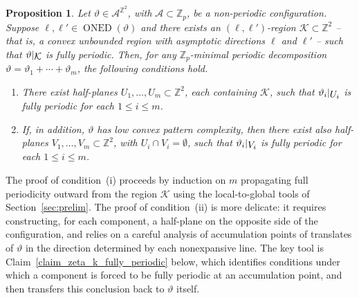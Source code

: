 \documentclass[12pt]{amsart}
\numberwithin{equation}{section}
\newtheorem{proposition}[theorem]{Proposition}
\DeclareMathOperator{\nexpd}{ONED}
\newcommand{\bb}[1]{\mathbb{#1}}
\newcommand{\sob}[1]{\ensuremath{{\mathbin |}\raise-.4ex\hbox{$#1$}}}
\begin{document}
\begin{proposition}\label{prop_fully_periodic_on strips}
Let $\vartheta \in \mathcal{A}^{\bb{Z}^2}$, with \(\mathcal{A} \subset \bb{Z}_p\), be a non-periodic configuration. Suppose $\pmb{\ell}, \pmb{\ell}' \in \nexpd(\vartheta)$ and there exists an $(\pmb{\ell},\pmb{\ell}')$-region $\mathcal{K} \subset \mathbb{Z}^2$ -- that is, a convex unbounded region with asymptotic directions $\pmb{\ell}$ and $\pmb{\ell}'$ -- such that $\vartheta \sob{\mathcal{K}}$ is fully periodic. Then, for any $\bb{Z}_p$-minimal periodic decomposition $\vartheta = \vartheta_1+\cdots+\vartheta_m$, the following conditions hold.   
\begin{enumerate}[label=(\roman*), itemsep=5pt]
	\item There exist half-planes $U_1, \ldots, U_m \subset \bb{Z}^2$, each containing $\mathcal{K} $, such that $\vartheta_i\sob{U_i}$ is fully periodic for each $ 1\le i \le m $. 
	
	\item If, in addition, $\vartheta$ has low convex pattern complexity, then there exist also half-planes $V_1, \ldots, V_m \subset \bb{Z}^2$, with $U_i \cap V_i = \emptyset$, such that $\vartheta_i\sob{V_i}$ is fully periodic for each $ 1\le i \le m $.
\end{enumerate}
\end{proposition}

The proof of condition~(i) proceeds by induction on $m$ propagating full periodicity outward from the region $ \mathcal K $ using the local-to-global tools of Section~\ref{sec:prelim}. The proof of condition~(ii) is more delicate: it requires constructing, for each component, a half-plane on the opposite side of the configuration, and relies on a careful analysis of accumulation points of translates of $\vartheta$ in the direction determined by each nonexpansive line. The key tool is Claim~\ref{claim_zeta_k_fully_periodic} below, which identifies conditions under which a component is forced to be fully periodic at an accumulation point, and then transfers this conclusion back to $\vartheta$ itself.
\end{document}
